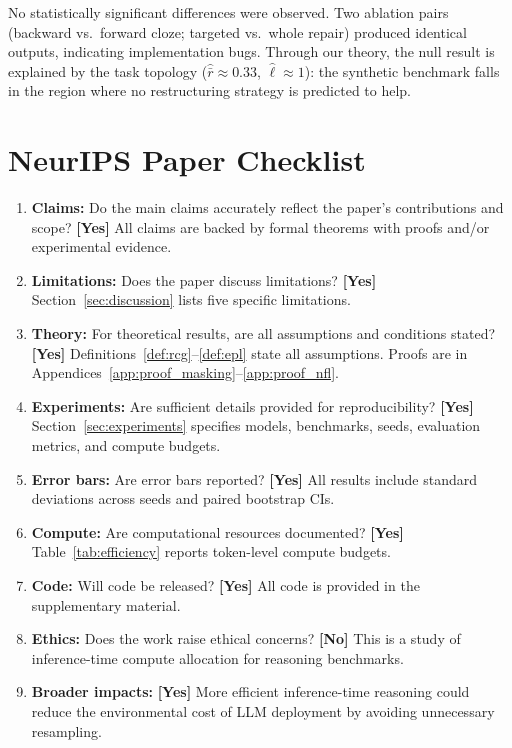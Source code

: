 \documentclass{article}
\begin{document}
No statistically significant differences were observed. Two ablation pairs (backward vs.\ forward cloze; targeted vs.\ whole repair) produced identical outputs, indicating implementation bugs. Through our theory, the null result is explained by the task topology ($\hat{\bar{r}} \approx 0.33$, $\hat{\ell} \approx 1$): the synthetic benchmark falls in the region where no restructuring strategy is predicted to help.

\section{NeurIPS Paper Checklist}

\begin{enumerate}[nosep]
\item \textbf{Claims:} Do the main claims accurately reflect the paper's contributions and scope? \textbf{[Yes]} All claims are backed by formal theorems with proofs and/or experimental evidence.

\item \textbf{Limitations:} Does the paper discuss limitations? \textbf{[Yes]} Section~\ref{sec:discussion} lists five specific limitations.

\item \textbf{Theory:} For theoretical results, are all assumptions and conditions stated? \textbf{[Yes]} Definitions~\ref{def:rcg}--\ref{def:epl} state all assumptions. Proofs are in Appendices~\ref{app:proof_masking}--\ref{app:proof_nfl}.

\item \textbf{Experiments:} Are sufficient details provided for reproducibility? \textbf{[Yes]} Section~\ref{sec:experiments} specifies models, benchmarks, seeds, evaluation metrics, and compute budgets.

\item \textbf{Error bars:} Are error bars reported? \textbf{[Yes]} All results include standard deviations across seeds and paired bootstrap CIs.

\item \textbf{Compute:} Are computational resources documented? \textbf{[Yes]} Table~\ref{tab:efficiency} reports token-level compute budgets.

\item \textbf{Code:} Will code be released? \textbf{[Yes]} All code is provided in the supplementary material.

\item \textbf{Ethics:} Does the work raise ethical concerns? \textbf{[No]} This is a study of inference-time compute allocation for reasoning benchmarks.

\item \textbf{Broader impacts:} \textbf{[Yes]} More efficient inference-time reasoning could reduce the environmental cost of LLM deployment by avoiding unnecessary resampling.
\end{enumerate}
\end{document}
